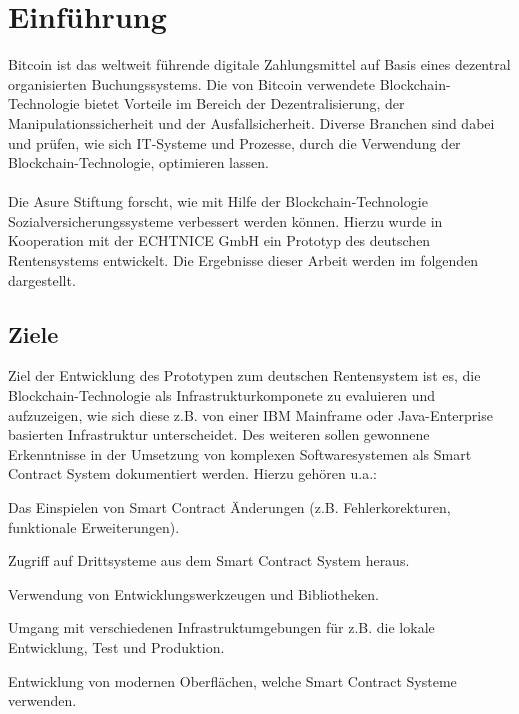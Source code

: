 \section{Einführung}
Bitcoin ist das weltweit führende digitale Zahlungsmittel auf Basis eines dezentral organisierten Buchungssystems. Die von Bitcoin verwendete Blockchain-Technologie bietet Vorteile im Bereich der Dezentralisierung, der Manipulationssicherheit und der Ausfallsicherheit. Diverse Branchen sind dabei und prüfen, wie sich IT-Systeme und Prozesse, durch die Verwendung der Blockchain-Technologie, optimieren lassen.

\paragraph*{}
Die Asure Stiftung forscht, wie mit Hilfe der Blockchain-Technologie Sozialversicherungssysteme verbessert werden können. Hierzu wurde in Kooperation mit der ECHTNICE GmbH ein Prototyp des deutschen Rentensystems entwickelt. Die Ergebnisse dieser Arbeit werden im folgenden dargestellt.

\subsection{Ziele}

Ziel der Entwicklung des Prototypen zum deutschen Rentensystem ist es, die Blockchain-Technologie als Infrastrukturkomponete zu evaluieren und aufzuzeigen, wie sich diese z.B. von einer IBM Mainframe oder Java-Enterprise basierten Infrastruktur unterscheidet. Des weiteren sollen gewonnene Erkenntnisse in der Umsetzung von komplexen Softwaresystemen als Smart Contract System dokumentiert werden. Hierzu gehören u.a.:

\begin{compactenum}
\item Das Einspielen von Smart Contract Änderungen (z.B. Fehlerkorekturen, funktionale Erweiterungen).
\item Zugriff auf Drittsysteme aus dem Smart Contract System heraus.
\item Verwendung von Entwicklungswerkzeugen und Bibliotheken.
\item Umgang mit verschiedenen Infrastruktumgebungen für z.B. die lokale Entwicklung, Test und Produktion.
\item Entwicklung von modernen Oberflächen, welche Smart Contract Systeme verwenden.
\end{compactenum}

